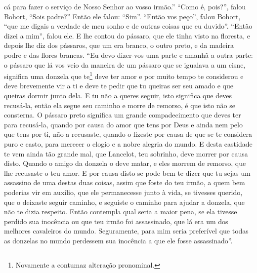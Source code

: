 cá para fazer o serviço de Nosso Senhor ao vosso irmão.” “Como é, pois?”, falou
Bohort, “Sois padre?” Então ele falou: “Sim”. “Então vos peço”, falou Bohort,
“que me digais a verdade de meu sonho e de outras coisas que eu duvido”. “Então
dizei a mim”, falou ele. E lhe contou do pássaro, que ele tinha visto na
floresta, e depois lhe diz dos pássaros, que um era branco, o outro preto, e da
madeira podre e das flores brancas. “Eu devo dizer-vos uma parte e amanhã a
outra parte: o pássaro que lá vos veio da maneira de um pássaro que se igualava
a um cisne, significa uma donzela que te\footnote{ Novamente a contumaz
alteração pronominal. } deve ter amor e por muito tempo te
considerou e deve brevemente vir a ti e deve te pedir que tu queiras ser seu
amado e que queiras dormir junto dela. E tu não a queres seguir, isto significa
que deves recusá-la, então ela segue seu caminho e morre de remorso, é que isto
não se consterna. O pássaro preto significa um grande compadecimento que deves
ter para recusá-la, quando por causa do amor que tens por Deus e ainda nem pelo
que tens por ti, não a recusaste, quando o fizeste por causa de que se te
considera puro e casto, para merecer o elogio e a nobre alegria do mundo. E
desta castidade te vem ainda tão grande mal, que Lancelot, teu sobrinho, deve
morrer por causa disto. Quando o amigo da donzela o deve matar, e eles morrem
de remorso, que lhe recusaste o teu amor. E por causa disto se pode bem te
dizer que tu sejas um assassino de uma destas duas coisas, assim que foste do
teu irmão, a quem bem poderias vir em auxílio, que ele permanecesse junto à
vida, se tivesses querido, que o deixaste seguir caminho, e seguiste o caminho
para ajudar a donzela, que não te dizia respeito. Então contempla qual seria a
maior pena, se ela tivesse perdido sua inocência ou que teu irmão foi
assassinado, que lá era um dos melhores cavaleiros do mundo. Seguramente, para
mim seria preferível que todas as donzelas no mundo perdessem sua inocência a
que ele fosse assassinado”. 

